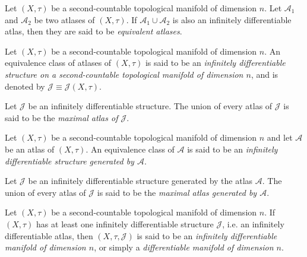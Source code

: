 \documentclass{_mypackages/monograph}
\begin{document}
\begin{definition} Let \((X,\tau)\) be a second-countable topological manifold of dimension \(n\). Let \(\mathcal{A}_1\) and \(\mathcal{A}_2\) be two atlases of \((X,\tau)\). If \(\mathcal{A}_1\cup \mathcal{A}_2\) is also an infinitely differentiable atlas, then they are said to be \emph{equivalent atlases}.
\end{definition}

\begin{definition} Let \((X,\tau)\) be
a second-countable topological manifold of dimension \(n\). An equivalence class of atlases of \((X,\tau)\) is said to be an \emph{infinitely differentiable structure on a second-countable topological manifold of dimension \(n\)}, and is denoted by \(\mathcal{J}\equiv\mathcal{J}(X,\tau)\).
\end{definition}

\begin{definition} Let \(\mathcal{J}\) be an infinitely differentiable structure. The union of every atlas of \(\mathcal{J}\) is said to be the \emph{maximal atlas of \(\mathcal{J}\)}.
\end{definition}

\begin{definition} Let \((X,\tau)\) be a second-countable topological manifold of dimension \(n\) and let \(\mathcal{A}\) be an atlas of \((X,\tau)\). An equivalence class of \(\mathcal{A}\) is said to be an \emph{infinitely differentiable structure generated by \(\mathcal{A}\)}.
\end{definition}

\begin{definition} Let \(\mathcal{J}\) be an infinitely differentiable structure generated by the atlas \(\mathcal{A}\). The union of every atlas of \(\mathcal{J}\) is said to be the \emph{maximal atlas generated by \(\mathcal{A}\)}.
\end{definition}

\begin{definition} Let \((X,\tau)\) be a second-countable topological manifold of dimension \(n\). If \((X,\tau)\) has at least one infinitely differentiable structure \(\mathcal{J}\), i.e. an infinitely differentiable atlas, then \((X,\tau,\mathcal{J})\) is said to be an \emph{infinitely differentiable manifold of dimension \(n\)}, or simply a \emph{differentiable manifold of dimension \(n\)}.
\end{definition}
\end{document}
